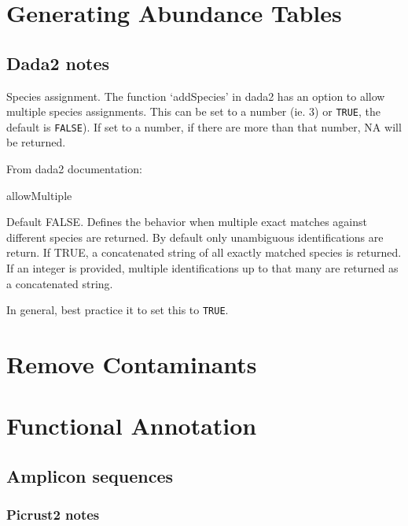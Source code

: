 \documentclass[
]{book}
\begin{document}
\hypertarget{generating-abundance-tables}{%
\chapter{Generating Abundance Tables}\label{generating-abundance-tables}}

\hypertarget{dada2-notes}{%
\section{Dada2 notes}\label{dada2-notes}}

Species assignment. The function `addSpecies' in dada2 has an option to allow multiple species assignments. This can be set to a number (ie. 3) or \texttt{TRUE}, the default is \texttt{FALSE}). If set to a number, if there are more than that number, NA will be returned.

From dada2 documentation:

allowMultiple

Default FALSE. Defines the behavior when multiple exact matches against different species are returned. By default only unambiguous identifications are return. If TRUE, a concatenated string of all exactly matched species is returned. If an integer is provided, multiple identifications up to that many are returned as a concatenated string.

In general, best practice it to set this to \texttt{TRUE}.

\hypertarget{remove-contaminants}{%
\chapter{Remove Contaminants}\label{remove-contaminants}}

\hypertarget{functional-annotation}{%
\chapter{Functional Annotation}\label{functional-annotation}}

\hypertarget{amplicon-sequences}{%
\section{Amplicon sequences}\label{amplicon-sequences}}

\hypertarget{picrust2-notes}{%
\subsection{Picrust2 notes}\label{picrust2-notes}}
\end{document}
